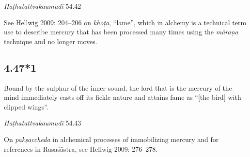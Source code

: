 \begin{ekdosis}
\begin{testimonia}[hp04_047]
\emph{Haṭhatattvakaumudī} 54.42
\begin{versinnote}
\end{versinnote}
\end{testimonia}

\begin{philcomm}[hp04_047]
See Hellwig 2009: 204–206 on \emph{khoṭa}, “lame”, which in alchemy is a technical term use to describe mercury that has been processed many times using the \emph{māraṇa} technique and no longer moves.
\end{philcomm}

\subsection*{4.47*1}
\begin{translation}[hp04_047_1]
Bound by the sulphur of the inner sound, the lord that is the mercury of the mind immediately casts off its fickle nature and attains fame as “[the bird] with clipped wings”.
\end{translation} %


\begin{testimonia}[hp04_047_1]
\emph{Haṭhatattvakaumudī} 54.43
\begin{versinnote}
\end{versinnote}
\end{testimonia}

\begin{philcomm}[hp04_047_1]
On \emph{pakṣaccheda} in alchemical processes of immobilizing mercury and for references in Rasaśāstra, see Hellwig 2009: 276–278.




\end{philcomm}
\end{ekdosis}
